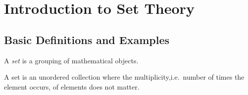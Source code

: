 
\section{Introduction to Set Theory}

\subsection{Basic Definitions and Examples}

\begin{definition}
    A \emph{set} is a grouping of mathematical objects. 
\end{definition}

A set is an unordered collection where the multiplicity,i.e.\ number of times the element occurs, of elements does not matter.

